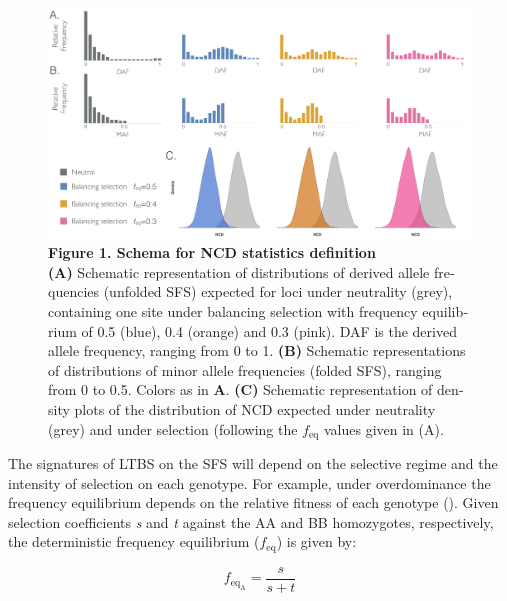 \begin{refsection}
\begin{otherlanguage}{english}
\begin{figure}
\includegraphics[]{chap2_folder/Figures/Fig1.tiff}
\caption*{\textbf{Figure 1. Schema for NCD statistics definition}\\ 
\textbf{(A)} Schematic representation of distributions of derived allele frequencies (unfolded SFS) expected for loci under neutrality (grey), containing one site under balancing selection with frequency equilibrium of 0.5 (blue), 0.4 (orange) and 0.3 (pink). DAF is the derived allele frequency, ranging from 0 to 1. \textbf{(B)} Schematic representations of distributions of minor allele frequencies (folded SFS), ranging from 0 to 0.5. Colors as in \textbf{A}. \textbf{(C)} Schematic representation of density plots of the distribution of NCD expected under neutrality (grey) and under selection (following the $f_{\mathrm{eq}}$ values given in (A). 
}
\end{figure}

The signatures of LTBS on the SFS will depend on the selective regime and the intensity of selection on each genotype. For example, under overdominance the frequency equilibrium depends on the relative fitness of each genotype (\cite{Charlesworth2006,Charlesworth2010,Fijarczyk2015}). Given selection coefficients \emph{s} and \emph{t} against the AA and BB homozygotes, respectively, the deterministic frequency equilibrium ($f_{\mathrm{eq}}$) is given by:


\begin{equation}
f_{\mathrm{eq_{A}}}=\frac{s}{s+t}
\end{equation}



\end{otherlanguage}
\end{refsection}
